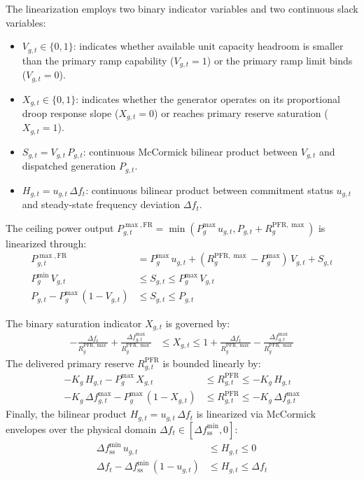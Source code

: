 \documentclass[journal]{IEEEtran}
\begin{document}
The linearization employs two binary indicator variables and two continuous slack variables:
\begin{itemize}
  \item $V_{g,t} \in \{0, 1\}$: indicates whether available unit capacity headroom is smaller than the primary ramp capability ($V_{g,t} = 1$) or the primary ramp limit binds ($V_{g,t} = 0$).
  \item $X_{g,t} \in \{0, 1\}$: indicates whether the generator operates on its proportional droop response slope ($X_{g,t} = 0$) or reaches primary reserve saturation ($X_{g,t} = 1$).
  \item $S_{g,t} = V_{g,t}\,P_{g,t}$: continuous McCormick bilinear product between $V_{g,t}$ and dispatched generation $P_{g,t}$.
  \item $H_{g,t} = u_{g,t}\,\Delta f_t$: continuous bilinear product between commitment status $u_{g,t}$ and steady-state frequency deviation $\Delta f_t$.
\end{itemize}

The ceiling power output $P_{g,t}^{\max,\text{FR}} = \min(P_g^{\max}\,u_{g,t}, P_{g,t} + R_g^{\text{PFR},\max})$ is linearized through:
\begin{align}
  P_{g,t}^{\max,\text{FR}} &= P_g^{\max}\,u_{g,t} + (R_g^{\text{PFR},\max} - P_g^{\max})\,V_{g,t} + S_{g,t}
  \label{eq:lin_pmaxfr} \\
  P_g^{\min}\,V_{g,t} &\leq S_{g,t} \leq P_g^{\max}\,V_{g,t}
  \label{eq:lin_slack1} \\
  P_{g,t} - P_g^{\max}\,(1 - V_{g,t}) &\leq S_{g,t} \leq P_{g,t}
  \label{eq:lin_slack2}
\end{align}

The binary saturation indicator $X_{g,t}$ is governed by:
\begin{align}
  -\frac{\Delta f_t}{R_g^{\text{PFR},\max}} + \frac{\Delta f_{g,t}^{\max}}{R_g^{\text{PFR},\max}} &\leq X_{g,t} \leq 1 + \frac{\Delta f_t}{R_g^{\text{PFR},\max}} - \frac{\Delta f_{g,t}^{\max}}{R_g^{\text{PFR},\max}}
  \label{eq:lin_xflag}
\end{align}
The delivered primary reserve $R_{g,t}^{\text{PFR}}$ is bounded linearly by:
\begin{align}
  -K_g\,H_{g,t} - P_g^{\max}\,X_{g,t} &\leq R_{g,t}^{\text{PFR}} \leq -K_g\,H_{g,t}
  \label{eq:lin_rpfr1} \\
  -K_g\,\Delta f_{g,t}^{\max} - P_g^{\max}\,(1 - X_{g,t}) &\leq R_{g,t}^{\text{PFR}} \leq -K_g\,\Delta f_{g,t}^{\max}
  \label{eq:lin_rpfr2}
\end{align}
Finally, the bilinear product $H_{g,t} = u_{g,t}\,\Delta f_t$ is linearized via McCormick envelopes over the physical domain $\Delta f_t \in [\Delta f_{\text{ss}}^{\min}, 0]$:
\begin{align}
  \Delta f_{\text{ss}}^{\min}\,u_{g,t} &\leq H_{g,t} \leq 0
  \label{eq:lin_h1} \\
  \Delta f_t - \Delta f_{\text{ss}}^{\min}\,(1 - u_{g,t}) &\leq H_{g,t} \leq \Delta f_t
  \label{eq:lin_h2}
\end{align}
\end{document}
